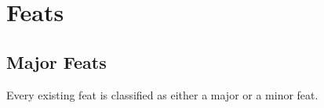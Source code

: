 \documentclass[letterpaper,twocolumn,openany,nodeprecatedcode,bg=print]{dndbook}
\begin{document}
%
%
%
%
%
%
%
%










\appendix
\onecolumn

\chapter{Feats}

\section{Major Feats}
\label{major-feats-table}

Every existing feat is classified as either a major or a minor feat. 
\end{document}
